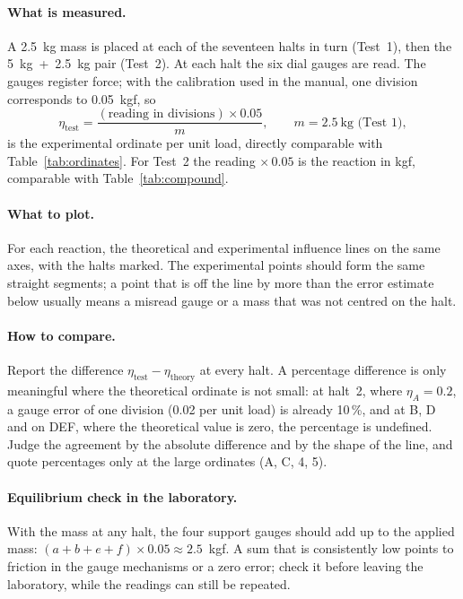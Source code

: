 \documentclass[11pt,a4paper]{article}
\newcommand{\il}[1]{\eta_{#1}}
\begin{document}
\paragraph{What is measured.} A \SI{2.5}{kg} mass is placed at each of the seventeen halts in turn (Test~1), then the \SI{5}{kg}~+~\SI{2.5}{kg} pair (Test~2). At each halt the six dial gauges are read. The gauges register force; with the calibration used in the manual, one division corresponds to \SI{0.05}{kgf}, so
\begin{equation}
  \il{\text{test}} = \frac{(\text{reading in divisions}) \times 0.05}{m}, \qquad m = 2.5~\text{kg (Test 1)},
  \label{eq:reduce}
\end{equation}
is the experimental ordinate per unit load, directly comparable with Table~\ref{tab:ordinates}. For Test~2 the reading $\times\,0.05$ is the reaction in kgf, comparable with Table~\ref{tab:compound}.

\paragraph{What to plot.} For each reaction, the theoretical and experimental influence lines on the same axes, with the halts marked. The experimental points should form the same straight segments; a point that is off the line by more than the error estimate below usually means a misread gauge or a mass that was not centred on the halt.

\paragraph{How to compare.} Report the difference $\il{\text{test}} - \il{\text{theory}}$ at every halt. A percentage difference is only meaningful where the theoretical ordinate is not small: at halt~2, where $\il{A} = 0.2$, a gauge error of one division (0.02 per unit load) is already 10\,\%, and at B, D and on DEF, where the theoretical value is zero, the percentage is undefined. Judge the agreement by the absolute difference and by the shape of the line, and quote percentages only at the large ordinates (A, C, 4, 5).

\paragraph{Equilibrium check in the laboratory.} With the mass at any halt, the four support gauges should add up to the applied mass: $(a + b + e + f) \times 0.05 \approx 2.5$~kgf. A sum that is consistently low points to friction in the gauge mechanisms or a zero error; check it before leaving the laboratory, while the readings can still be repeated.
\end{document}
